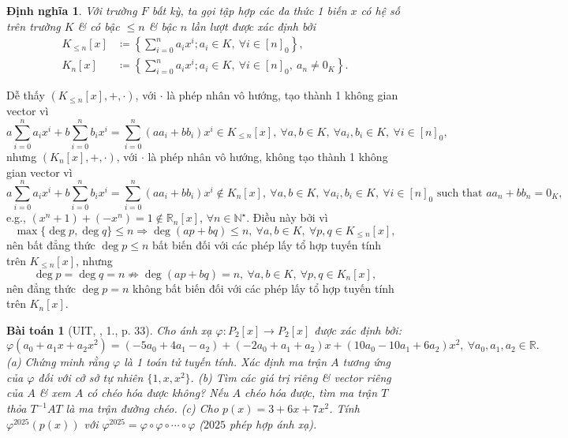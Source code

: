 \documentclass{article}
\newtheorem{baitoan}{Bài toán}
\newtheorem{dinhnghia}{Định nghĩa}
\begin{document}
\begin{dinhnghia}
	Với trường $F$ bất kỳ, ta gọi tập hợp các đa thức 1 biến $x$ có hệ số trên trường $K$ \& có bậc $\le n$ \& bậc $n$ lần lượt được xác định bởi
	\begin{align*}
		K_{\le n}[x]&\coloneqq\left\{\sum_{i=0}^n a_ix^i;a_i\in K,\ \forall i\in[n]_0\right\},\\
		K_n[x]&\coloneqq\left\{\sum_{i=0}^n a_ix^i;a_i\in K,\ \forall i\in[n]_0,\ a_n\ne0_K\right\}.
	\end{align*}
\end{dinhnghia}
Dễ thấy $(K_{\le n}[x],+,\cdot)$, với $\cdot$ là phép nhân vô hướng, tạo thành 1 không gian vector vì
\begin{equation*}
	a\sum_{i=0}^n a_ix^i + b\sum_{i=0}^n b_ix^i = \sum_{i=0}^n (aa_i + bb_i)x^i\in K_{\le n}[x],\ \forall a,b\in K,\ \forall a_i,b_i\in K,\ \forall i\in[n]_0,
\end{equation*}
nhưng $(K_n[x],+,\cdot)$, với $\cdot$ là phép nhân vô hướng, không tạo thành 1 không gian vector vì
\begin{equation*}
	a\sum_{i=0}^n a_ix^i + b\sum_{i=0}^n b_ix^i = \sum_{i=0}^n (aa_i + bb_i)x^i\notin K_n[x],\ \forall a,b\in K,\ \forall a_i,b_i\in K,\ \forall i\in[n]_0\mbox{ such that } aa_n + bb_n = 0_K,
\end{equation*}
e.g., $(x^n + 1) + (-x^n) = 1\notin\mathbb{R}_n[x]$, $\forall n\in\mathbb{N}^\star$. Điều này bởi vì
\begin{equation*}
	\max\{\deg p,\deg q\}\le n\Rightarrow\deg(ap + bq)\le n,\ \forall a,b\in K,\ \forall p,q\in K_{\le n}[x],
\end{equation*}
nên bất đẳng thức $\deg p\le n$ bất biến đối với các phép lấy tổ hợp tuyến tính trên $K_{\le n}[x]$, nhưng
\begin{equation*}
	\deg p = \deg q = n\not\Rightarrow\deg(ap + bq) = n,\ \forall a,b\in K,\ \forall p,q\in K_n[x],
\end{equation*}
nên đẳng thức $\deg p = n$ không bất biến đối với các phép lấy tổ hợp tuyến tính trên $K_n[x]$.

\begin{baitoan}[UIT, \cite{VMS_VMC2025}, 1., p. 33]
	Cho ánh xạ $\varphi:P_2[x]\to P_2[x]$ được xác định bởi:
	\begin{equation*}
		\varphi(a_0 + a_1x + a_2x^2) = (-5a_0 + 4a_1 - a_2) + (-2a_0 + a_1 + a_2)x + (10a_0 - 10a_1 + 6a_2)x^2,\ \forall a_0,a_1,a_2\in\mathbb{R}.
	\end{equation*}
	(a) Chứng minh rằng $\varphi$ là 1 toán tử tuyến tính. Xác định ma trận $A$ tương ứng của $\varphi$ đối với cở sở tự nhiên $\{1,x,x^2\}$. (b) Tìm các giá trị riêng \& vector riêng của $A$ \& xem $A$ có chéo hóa được không? Nếu $A$ chéo hóa được, tìm ma trận $T$ thỏa $T^{-1}AT$ là ma trận đường chéo. (c) Cho $p(x) = 3 + 6x + 7x^2$. Tính $\varphi^{2025}(p(x))$ với $\varphi^{2025} = \varphi\circ\varphi\circ\cdots\circ\varphi$ ($2025$ phép hợp ánh xạ).
\end{baitoan}
\end{document}
